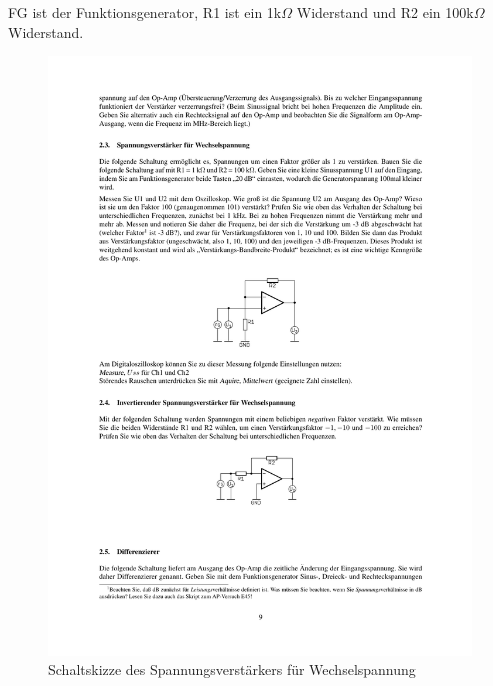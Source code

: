 \documentclass[12pt,a4paper]{article}
\begin{document}
FG ist der Funktionsgenerator, R1 ist ein 1k$\Omega$ Widerstand und R2 ein 100k$\Omega$ Widerstand.

\begin{figure}[H] 
  \centering
    \includegraphics[trim = 10mm 70mm 10mm 195mm, clip, scale = 1]{ep4_14[Page9].pdf}
  	\caption[Schaltskizze des Spannungsverstärkers für Wechselspannung]{Schaltskizze des Spannungsverstärkers für Wechselspannung\footnotemark}
  \label{fig:1}
\end{figure}
\end{document}
